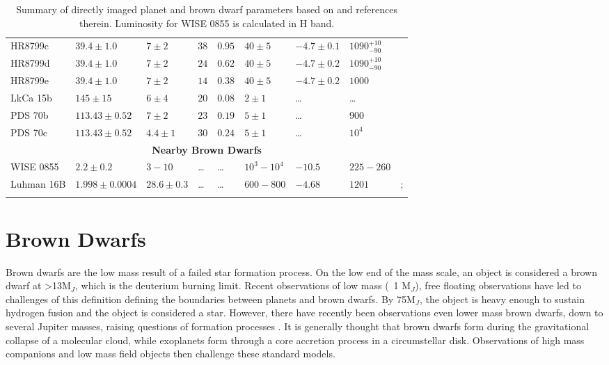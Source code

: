 \begin{landscape}
\begin{table}[t]
\begin{small}
\begin{tabular}{lllllllll}
				HR8799c   & $39.4\pm1.0$  & $7\pm2$     & $38$ & $0.95$ & $40\pm5$ & $-4.7\pm0.1$ & $1090^{+10}_{-90}$ &\parencite{Marois2008,Skemer2012}\\
				HR8799d   & $39.4\pm1.0$  & $7\pm2$     & $24$ & $0.62$ & $40\pm5$ & $-4.7\pm0.2$ & $1090^{+10}_{-90}$ &\parencite{Marois2008,Skemer2012}\\
				HR8799e   & $39.4\pm1.0$  & $7\pm2$     & $14$ & $0.38$ & $40\pm5$ & $-4.7\pm0.2$ & $1000$ &\parencite{Marois2008,Skemer2012}\\	
				LkCa 15b  & $145\pm15$    & $6\pm4$     & $20$ & $0.08$ & $2\pm1$ & \ldots & \ldots &\\
				PDS 70b   & $113.43\pm0.52$ & $7\pm2$   & $23$ & $0.19$ & $5\pm1$ & \ldots & $900$ &\parencite{Haffert2019}\\
				PDS 70c   & $113.43\pm0.52$ & $4.4\pm1$ & $30$ & $0.24$ & $5\pm1$ & \ldots &  $10^{4}$ & \parencite{Haffert2019}\\
				\midrule
				\multicolumn{9}{c}{\textbf{Nearby Brown Dwarfs}}\\
				\midrule
				WISE 0855   & $2.2\pm0.2$ & $3-10$ & \ldots & \ldots & $10^{3}-10^{4}$ & $-10.5$ &  $225-260$ & \parencite{Luhman2014,Tinney2014}\\
				Luhman 16B   & $1.998\pm0.0004$ & $28.6\pm0.3$ & \ldots & \ldots & $600-800$ & $-4.68$&  $1201$ & \parencite{Sahlmann2015};\\
																								&&&&&&&&\parencite{Garcia2017}\\
				\bottomrule
			\end{tabular}
		\end{small}
		\caption{Summary of directly imaged planet and brown dwarf parameters based on \parencite{Bowler2016} and references therein. Luminosity for WISE 0855 is calculated in H band.}
		\label{tab:exoplanetparams}
	\end{table}
\end{landscape}
\section{Brown Dwarfs}
Brown dwarfs are the low mass result of a failed star formation process.
On the low end of the mass scale, an object is considered a brown dwarf at >13M$_{J}$, which is the deuterium burning limit. 
Recent observations of low mass (~1 M$_{J}$), free floating observations have led to challenges of this definition defining the boundaries between planets and brown dwarfs.
By 75M$_{J}$, the object is heavy enough to sustain hydrogen fusion and the object is considered a star.
However, there have recently been observations even lower mass brown dwarfs, down to several Jupiter masses, raising questions of formation processes \parencite{Luhman2014}.
It is generally thought that brown dwarfs form during the gravitational collapse of a molecular cloud, while exoplanets form through a core accretion process in a circumstellar disk.
Observations of high mass companions and low mass field objects then challenge these standard models.

